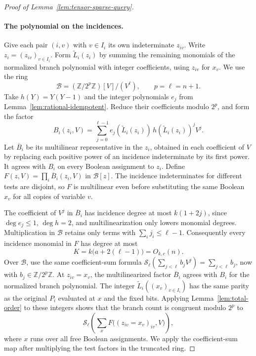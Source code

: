 \begin{proof}[Proof of Lemma~\ref{lem:tensor-sparse-query}]
\paragraph{The polynomial on the incidences.}
Give each pair $(i,v)$ with $v\in I_i$ its own indeterminate
$z_{iv}$. Write $z_i=(z_{iv})_{v\in I_i}$. Form
$\widetilde L_i(z_i)$ by summing the remaining monomials of the
normalized branch polynomial with integer coefficients, using $z_{iv}$
for $x_v$. We use the ring
\[
 \mathcal B=(\mathbb Z/2^p\mathbb Z)[V]/(V^\ell),
 \qquad p=\ell=n+1 .
\]
Take $h(Y)=Y(Y-1)$ and the integer polynomials $e_j$ from
Lemma~\ref{lem:rational-idempotent}. Reduce their coefficients
modulo $2^p$, and form the factor
\[
 B_i(z_i,V)=\sum_{j=0}^{\ell-1}
   e_j(\widetilde L_i(z_i))\,h(\widetilde L_i(z_i))^j V^j .
\]
Let $\overline B_i$ be its multilinear representative in the $z_i$,
obtained in each coefficient of $V$ by replacing each positive
power of an incidence indeterminate by its first power. It agrees
with $B_i$ on every Boolean assignment to $z_i$. Define
$F(z,V)=\prod_i\overline B_i(z_i,V)$ in $\mathcal B[z]$. The
incidence indeterminates for different tests are disjoint, so $F$
is multilinear even before substituting the same Boolean $x_v$ for
all copies of variable $v$.

The coefficient of $V^j$ in $\overline B_i$ has incidence degree
at most $k(1+2j)$, since $\deg e_j\le1$, $\deg h=2$, and
multilinearization only lowers monomial degrees. Multiplication in
$\mathcal B$ retains only terms with $\sum_i j_i\le\ell-1$.
Consequently every incidence monomial in $F$ has degree at most
\begin{equation}\label{eq:sharp-incidence-degree}
 K=k\bigl(a+2(\ell-1)\bigr)=O_{k,c}(n).
\end{equation}
Over $\mathcal B$, use the same coefficient-sum formula
$\mathcal S_\ell(\sum_{j<\ell}b_jV^j)=\sum_{j<\ell}b_j$, now with
$b_j\in\mathbb Z/2^p\mathbb Z$. At $z_{iv}=x_v$, the multilinearized factor
$\overline B_i$ agrees with $B_i$ for the normalized branch polynomial.
The integer $\widetilde L_i((x_v)_{v\in I_i})$ has the same parity
as the original $P_i$ evaluated at $x$ and the fixed bits. Applying
Lemma~\ref{lem:total-order} to these integers shows that the branch
count is congruent modulo $2^p$ to
\begin{equation}\label{eq:sharp-branch-residue}
 \mathcal S_\ell\left(\sum_x F\bigl((z_{iv}=x_v)_{iv},V\bigr)\right),
\end{equation}
where $x$ runs over all free Boolean assignments. We apply the
coefficient-sum map after multiplying the test factors in the
truncated ring.


\end{proof}
